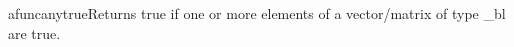 afunc{anytrue}{Returns true if one or more elements of a vector/matrix of type \_bl are true.}
\\\cvsiplh
\\\pyjvsiph

